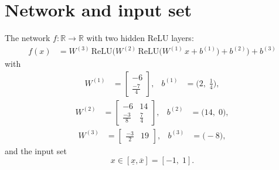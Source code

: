 \documentclass[11pt]{article}
\begin{document}
\section{Network and input set}
The network $f:\mathbb{R} \to \mathbb{R}$ with two hidden ReLU layers:
\begin{align*}
f(x) &= W^{(3)}\,\mathrm{ReLU}\bigl(W^{(2)}\,\mathrm{ReLU}\bigl(W^{(1)}\,x + b^{(1)}\bigr) + b^{(2)}\bigr) + b^{(3)}
\end{align*}
with
\begin{align*}
W^{(1)} &= \begin{bmatrix}
-6 \\
\frac{-7}{4}
\end{bmatrix}, & b^{(1)} &= \bigl(2,\; \frac{1}{4}\bigr),
\end{align*}
\begin{align*}
W^{(2)} &= \begin{bmatrix}
-6 & 14 \\
\frac{-3}{8} & \frac{7}{4}
\end{bmatrix}, & b^{(2)} &= \bigl(14,\; 0\bigr),
\end{align*}
\begin{align*}
W^{(3)} &= \begin{bmatrix}
\frac{-3}{2} & 19
\end{bmatrix}, & b^{(3)} &= \bigl(-8\bigr),
\end{align*}
and the input set
\begin{equation*}
 x \in [\underline{x}, \overline{x}] = [-1,\; 1].
\end{equation*}
\end{document}
